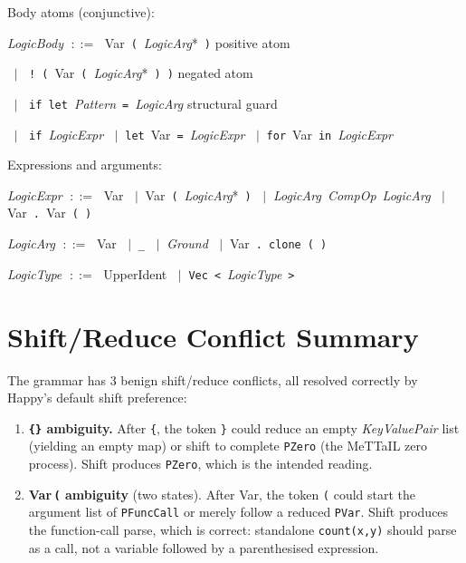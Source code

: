 \documentclass[11pt,a4paper]{article}
\newcommand{\kw}[1]{\texttt{\textcolor{kw}{#1}}}       %
\newcommand{\sym}[1]{\texttt{#1}}                       %
\newcommand{\nt}[1]{\textit{\textcolor{nt}{#1}}}        %
\newcommand{\tok}[1]{\textsf{#1}}                       %
\newcommand{\OR}{\ensuremath{\;\mid\;}}                  %
\newcommand{\bnfdef}{\ensuremath{\;::=\;}}               %
\newenvironment{grammar}{%
  \par\smallskip\begin{list}{}{%
    \setlength{\leftmargin}{1.5em}%
    \setlength{\itemsep}{2pt}%
    \setlength{\parsep}{0pt}}%
}{\end{list}\smallskip}
\begin{document}
\medskip\noindent Body atoms (conjunctive):

\begin{grammar}
\item \nt{LogicBody} \bnfdef
    \tok{Var}~\sym{(}~\nt{LogicArg}*~\sym{)}
    \hfill\textcolor{cmt}{positive atom}
\item \phantom{\nt{LogicBody}} \OR
    \sym{!}~\sym{(}~\tok{Var}~\sym{(}~\nt{LogicArg}*~\sym{)}~\sym{)}
    \hfill\textcolor{cmt}{negated atom}
\item \phantom{\nt{LogicBody}} \OR
    \kw{if}~\kw{let}~\nt{Pattern}~\sym{=}~\nt{LogicArg}
    \hfill\textcolor{cmt}{structural guard}
\item \phantom{\nt{LogicBody}} \OR
    \kw{if}~\nt{LogicExpr}
    \OR \kw{let}~\tok{Var}~\sym{=}~\nt{LogicExpr}
    \OR \kw{for}~\tok{Var}~\kw{in}~\nt{LogicExpr}
\end{grammar}

\medskip\noindent Expressions and arguments:

\begin{grammar}
\item \nt{LogicExpr} \bnfdef
    \tok{Var}
    \OR \tok{Var}~\sym{(}~\nt{LogicArg}*~\sym{)}
    \OR \nt{LogicArg}~\nt{CompOp}~\nt{LogicArg}
    \OR \tok{Var}~\sym{.}~\tok{Var}~\sym{(}~\sym{)}
\item \nt{LogicArg} \bnfdef
    \tok{Var}
    \OR \sym{\_}
    \OR \nt{Ground}
    \OR \tok{Var}~\sym{.}~\kw{clone}~\sym{(}~\sym{)}
\item \nt{LogicType} \bnfdef
    \tok{UpperIdent}
    \OR \kw{Vec}~\sym{<}~\nt{LogicType}~\sym{>}
\end{grammar}


\section*{Shift/Reduce Conflict Summary}
\label{sec:conflicts}

The grammar has 3 benign shift/reduce conflicts, all resolved correctly
by Happy's default shift preference:

\begin{enumerate}[leftmargin=2em]
\item \textbf{\sym{\{}\sym{\}} ambiguity.}\;
  After \sym{\{}, the token \sym{\}} could reduce an empty
  \nt{KeyValuePair} list (yielding an empty map) or shift to complete
  \texttt{PZero} (the MeTTaIL zero process).  Shift produces
  \texttt{PZero}, which is the intended reading.

\item \textbf{\tok{Var}\,\sym{(} ambiguity} (two states).\;
  After \tok{Var}, the token \sym{(} could start the argument list of
  \texttt{PFuncCall} or merely follow a reduced \texttt{PVar}.  Shift
  produces the function-call parse, which is correct: standalone
  \texttt{count(x,y)} should parse as a call, not a variable followed by
  a parenthesised expression.
\end{enumerate}
\end{document}
